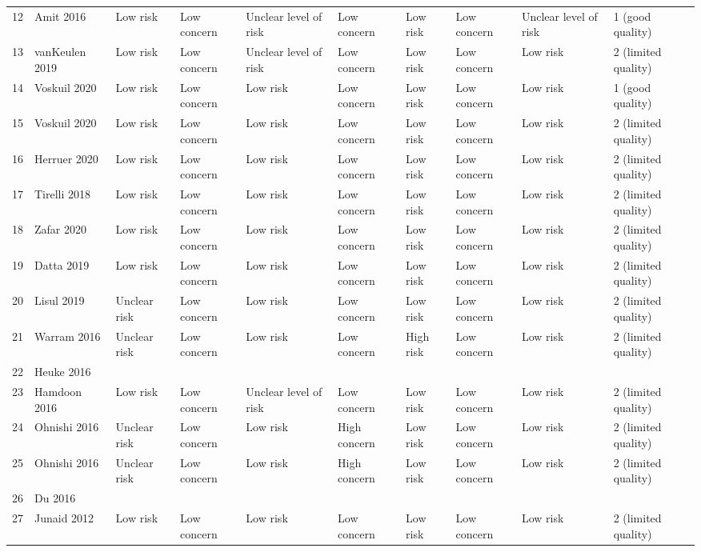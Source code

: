 \begin{table}[ht]
\begin{tabular}{rlllllllll}
  12 & Amit 2016 & Low risk & Low concern & Unclear level of risk & Low concern & Low risk & Low concern & Unclear level of risk & 1 (good quality) \\ 
  13 & vanKeulen 2019 & Low risk & Low concern & Unclear level of risk & Low concern & Low risk & Low concern & Low risk & 2 (limited quality) \\ 
  14 & Voskuil 2020 & Low risk & Low concern & Low risk & Low concern & Low risk & Low concern & Low risk & 1 (good quality) \\ 
  15 & Voskuil 2020 & Low risk & Low concern & Low risk & Low concern & Low risk & Low concern & Low risk & 2 (limited quality) \\ 
  16 & Herruer 2020 & Low risk & Low concern & Low risk & Low concern & Low risk & Low concern & Low risk & 2 (limited quality) \\ 
  17 & Tirelli 2018 & Low risk & Low concern & Low risk & Low concern & Low risk & Low concern & Low risk & 2 (limited quality) \\ 
  18 & Zafar 2020 & Low risk & Low concern & Low risk & Low concern & Low risk & Low concern & Low risk & 2 (limited quality) \\ 
  19 & Datta 2019 & Low risk & Low concern & Low risk & Low concern & Low risk & Low concern & Low risk & 2 (limited quality) \\ 
  20 & Lisul 2019 & Unclear risk & Low concern & Low risk & Low concern & Low risk & Low concern & Low risk & 2 (limited quality) \\ 
  21 & Warram 2016 & Unclear risk & Low concern & Low risk & Low concern & High risk & Low concern & Low risk & 2 (limited quality) \\ 
  22 & Heuke 2016 &  &  &  &  &  &  &  &  \\ 
  23 & Hamdoon 2016 & Low risk & Low concern & Unclear level of risk & Low concern & Low risk & Low concern & Low risk & 2 (limited quality) \\ 
  24 & Ohnishi 2016 & Unclear risk & Low concern & Low risk & High concern & Low risk & Low concern & Low risk & 2 (limited quality) \\ 
  25 & Ohnishi 2016 & Unclear risk & Low concern & Low risk & High concern & Low risk & Low concern & Low risk & 2 (limited quality) \\ 
  26 & Du 2016 &  &  &  &  &  &  &  &  \\ 
  27 & Junaid 2012 & Low risk & Low concern & Low risk & Low concern & Low risk & Low concern & Low risk & 2 (limited quality) \\ 

\end{tabular}
\end{table}
